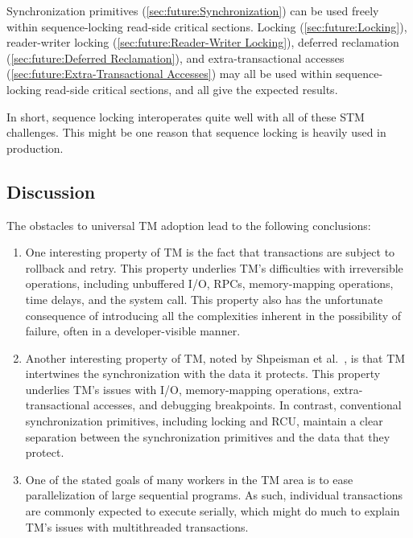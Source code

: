 Synchronization primitives (\cref{sec:future:Synchronization})
can be used freely within sequence-locking read-side critical sections.
Locking (\cref{sec:future:Locking}),
reader-writer locking (\cref{sec:future:Reader-Writer Locking}),
deferred reclamation (\cref{sec:future:Deferred Reclamation}),
and extra-transactional accesses
(\cref{sec:future:Extra-Transactional Accesses})
may all be used within sequence-locking read-side critical sections,
and all give the expected results.

In short, sequence locking interoperates quite well with all of these
STM challenges.
This might be one reason that sequence locking is heavily used in
production.

\subsection{Discussion}
\label{sec:future:Discussion}

The obstacles to universal TM adoption lead to the following
conclusions:

\begin{enumerate}
\item	One interesting property of TM is the fact that transactions are
	subject to rollback and retry.
	This property underlies TM's difficulties with irreversible
	operations, including unbuffered I/O, RPCs, memory-mapping
	operations, time delays, and the  system call.
	This property also has the unfortunate consequence of introducing
	all the complexities inherent in the possibility of failure,
	often in a developer-visible manner.
\item	Another interesting property of TM, noted by
	Shpeisman et al.~\cite{TatianaShpeisman2009CppTM}, is that TM
	intertwines the synchronization with the data it protects.
	This property underlies TM's issues with I/O, memory-mapping
	operations, extra-transactional accesses, and debugging
	breakpoints.
	In contrast, conventional synchronization primitives, including
	locking and RCU, maintain a clear separation between the
	synchronization primitives and the data that they protect.
\item	One of the stated goals of many workers in the TM area is to
	ease parallelization of large sequential programs.
	As such, individual transactions are commonly expected to
	execute serially, which might do much to explain TM's issues
	with multithreaded transactions.
\end{enumerate}

\QuickQuizEnd

